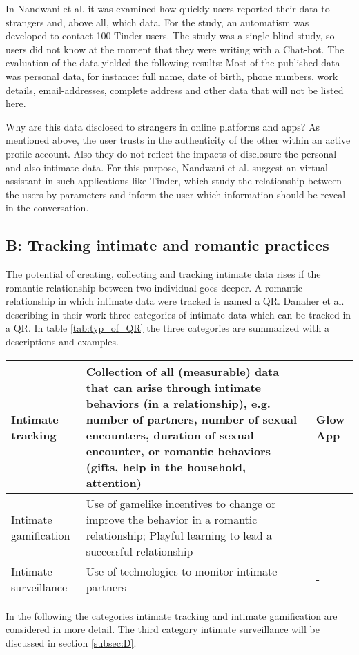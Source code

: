 In Nandwani et al. \cite{10.1007/978-3-319-61542-4_32} it was examined how quickly users reported their data to strangers and, above all, which data. For the study, an automatism was developed to contact 100 Tinder users. The study was a single blind study, so users did not know at the moment that they were writing with a Chat-bot. The evaluation of the data yielded the following results: Most of the published data was personal data, for instance: full name, date of birth, phone numbers, work details, email-addresses, complete address and other data that will not be listed here.

Why are this data disclosed to strangers in online platforms and apps? As mentioned above, the user trusts in the authenticity of the other within an active profile account. Also they do not reflect the impacts of disclosure the personal and also intimate data. For this purpose, Nandwani et al. \cite{10.1007/978-3-319-61542-4_32} suggest an virtual assistant in such applications like Tinder, which study the relationship between the users by parameters and inform the user which information should be reveal in the conversation.

\subsection{B: Tracking intimate and romantic practices}
\label{subsec:B}
The potential of creating, collecting and tracking intimate data rises if the romantic relationship between two individual goes deeper. A romantic relationship in which intimate data were tracked is named a \ac{QR}.
Danaher et al. \cite{doi:10.1080/15265161.2017.1409823} describing in their work three categories of intimate data which can be tracked in a \acs{QR}. In table \ref{tab:typ_of_QR} the three categories are summarized with a descriptions and examples.
\begin{table*}
	\caption{Interrelated types of data in \acl{QR}}
	\label{tab:typ_of_QR}
	\scriptsize
	\begin{center}
		\begin{tabular}{|p{4cm}|p{11cm}|p{2cm}|}
			\hline
			Intimate tracking &  Collection of all (measurable) data that can arise through intimate behaviors (in a relationship), e.g. number of partners, number of sexual encounters, duration of sexual encounter, or romantic behaviors (gifts, help in the household, attention) & Glow App \\
			\hline
			Intimate gamification & Use of gamelike incentives to change or improve the behavior in a romantic relationship; Playful learning to lead a successful relationship & - \\
			\hline
			Intimate surveillance & Use of technologies to monitor intimate partners & - \\
			\hline
		\end{tabular}
	\end{center}
\end{table*}
In the following the categories intimate tracking and intimate gamification are considered in more detail.
The third category intimate surveillance will be discussed in section \ref{subsec:D}.

